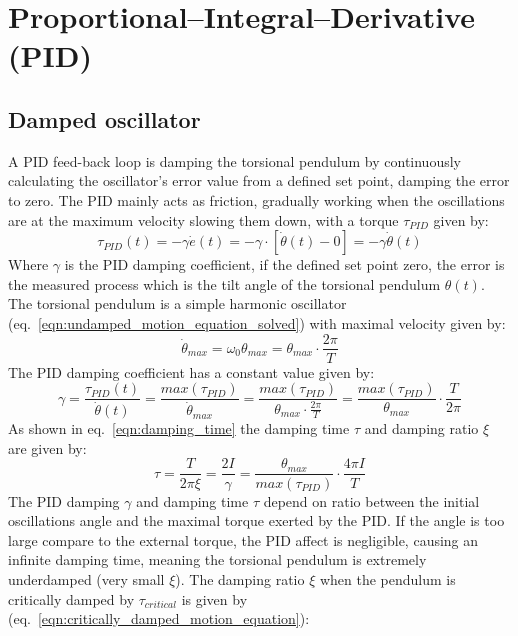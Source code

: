 \documentclass[\main/master.tex]{subfiles}
\begin{document}
\section{Proportional–Integral–Derivative (PID)}

\subsection{Damped oscillator}
A PID feed-back loop is damping the torsional pendulum by continuously calculating the oscillator's error value from a defined set point, damping the error to zero. The PID mainly acts as friction, gradually working when the oscillations are at the maximum velocity slowing them down, with a torque $\tau_{PID}$ given by:
\begin{equation}
\tau_{PID}(t) = -\gamma\dot{e}(t) =  -\gamma\cdot [\dot{\theta}(t)-0]  =  -\gamma\dot{\theta}(t)  \label{eqn:friction_torque_pid}
\end{equation}
Where $\gamma$ is the PID damping coefficient, if the defined set point zero, the error is the measured process which is the tilt angle of the torsional pendulum $\theta(t)$. The torsional pendulum is a simple harmonic oscillator (eq.~\ref{eqn:undamped_motion_equation_solved}) with maximal velocity given by:
\begin{equation}
\dot{\theta}_{max} = \omega_0\theta_{max} = \theta_{max}\cdot\frac{2\pi}{T}    \label{eqn:undamped_motion_equation_3}
\end{equation}
The PID damping coefficient has a constant value given by:
\begin{equation}
\gamma  =  \frac{\tau_{PID}(t)}{\dot{\theta}(t)} = \frac{max(\tau_{PID})}{\dot{\theta}_{max}} =  \frac{max(\tau_{PID})}{\theta_{max}\cdot\frac{2\pi}{T}} =\frac{max(\tau_{PID})}{\theta_{max}}\cdot \frac{ T}{2\pi}          \label{eqn:damped_pid_motion_equation_2}
\end{equation}
As shown in eq.~\ref{eqn:damping_time} the damping time $\tau$ and damping ratio $\xi$ are given by:
\begin{equation}
\tau = \frac{T}{2 \pi \xi } =  \frac{2I}{\gamma} = \frac{\theta_{max}}{ max(\tau_{PID})} \cdot \frac{4\pi I}{T}  \label{eqn:damping_time_pid}
\end{equation}
The PID damping $\gamma$ and damping time $\tau$ depend on ratio between the initial oscillations angle and the maximal torque exerted by the PID. If the angle is too large compare to the external torque, the PID affect is negligible, causing an infinite damping time, meaning the torsional pendulum is extremely underdamped (very small $\xi$). The damping ratio $\xi$ when the pendulum is critically damped by $\tau_{critical}$ is given by (eq.~\ref{eqn:critically_damped_motion_equation}):
\end{document}
